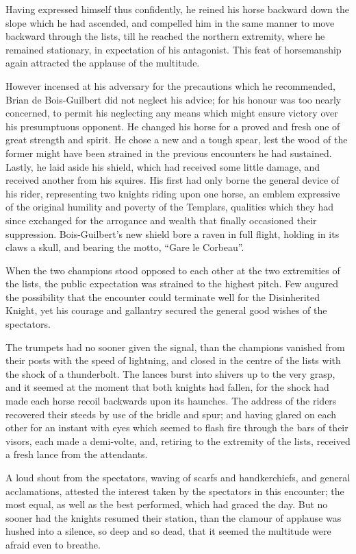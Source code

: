 Having expressed himself thus confidently, he reined his horse backward
down the slope which he had ascended, and compelled him in the same
manner to move backward through the lists, till he reached the northern
extremity, where he remained stationary, in expectation of his
antagonist. This feat of horsemanship again attracted the applause of
the multitude.

However incensed at his adversary for the precautions which he
recommended, Brian de Bois-Guilbert did not neglect his advice; for his
honour was too nearly concerned, to permit his neglecting any means
which might ensure victory over his presumptuous opponent. He changed
his horse for a proved and fresh one of great strength and spirit. He
chose a new and a tough spear, lest the wood of the former might have
been strained in the previous encounters he had sustained. Lastly, he
laid aside his shield, which had received some little damage, and
received another from his squires. His first had only borne the general
device of his rider, representing two knights riding upon one horse, an
emblem expressive of the original humility and poverty of the Templars,
qualities which they had since exchanged for the arrogance and wealth
that finally occasioned their suppression. Bois-Guilbert's new shield
bore a raven in full flight, holding in its claws a skull, and bearing
the motto, ``Gare le Corbeau''.

When the two champions stood opposed to each other at the two
extremities of the lists, the public expectation was strained to the
highest pitch. Few augured the possibility that the encounter could
terminate well for the Disinherited Knight, yet his courage and
gallantry secured the general good wishes of the spectators.

The trumpets had no sooner given the signal, than the champions vanished
from their posts with the speed of lightning, and closed in the centre
of the lists with the shock of a thunderbolt. The lances burst into
shivers up to the very grasp, and it seemed at the moment that both
knights had fallen, for the shock had made each horse recoil backwards
upon its haunches. The address of the riders recovered their steeds by
use of the bridle and spur; and having glared on each other for an
instant with eyes which seemed to flash fire through the bars of their
visors, each made a demi-volte, and, retiring to the extremity of the
lists, received a fresh lance from the attendants.

A loud shout from the spectators, waving of scarfs and handkerchiefs,
and general acclamations, attested the interest taken by the spectators
in this encounter; the most equal, as well as the best performed, which
had graced the day. But no sooner had the knights resumed their station,
than the clamour of applause was hushed into a silence, so deep and so
dead, that it seemed the multitude were afraid even to breathe.

